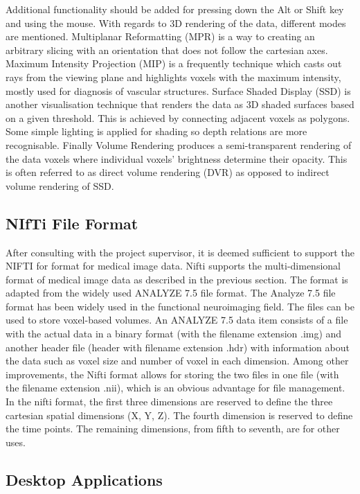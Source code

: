 \documentclass[a4paper,11pt,titlepage]{article}
\begin{document}
 Additional functionality should be added for pressing down the Alt or Shift key and using the mouse.
With regards to 3D rendering of the data, different modes are mentioned. Multiplanar Reformatting (MPR) is a way to creating an arbitrary slicing with an orientation that does not follow the cartesian axes. Maximum Intensity Projection (MIP) is a frequently technique which casts out rays from the viewing plane and highlights voxels with the maximum intensity, mostly used for diagnosis of vascular structures. Surface Shaded Display (SSD) is another visualisation technique that renders the data as 3D shaded surfaces based on a  given threshold. This is achieved by connecting adjacent voxels as polygons. Some simple lighting is applied for shading so depth relations are more recognisable. Finally Volume Rendering produces a semi-transparent rendering of the data voxels where individual voxels' brightness determine their opacity. This is often referred to as direct volume rendering (DVR) as opposed to indirect volume rendering of SSD.

\subsection{NIfTi File Format}

After consulting with the project supervisor, it is deemed sufficient to support the NIFTI for format for medical image data. Nifti supports the multi-dimensional format of medical image data as described in the previous section. The format is adapted from the widely used ANALYZE 7.5 file format. The Analyze 7.5 file format has been widely used in the functional neuroimaging field. The files can be used to store voxel-based volumes. An ANALYZE 7.5 data item consists of a file with the actual data in a binary format (with the filename extension .img) and another header file (header with filename extension .hdr) with information about the data such as voxel size and number of voxel in each dimension. Among other improvements, the Nifti format allows for storing the two files in one file (with the filename extension .nii), which is an obvious advantage for file management.
In the nifti format, the first three dimensions are reserved to define the three cartesian spatial dimensions (X, Y, Z). The fourth dimension is reserved to define the time points. The remaining dimensions, from fifth to seventh, are for other uses. 

\subsection{Desktop Applications}
\end{document}

